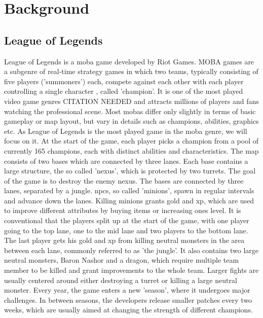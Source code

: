 \documentclass[12pt, a4paper, headinclude, twoside, plainheadsepline, open=right, numbers=noenddot, hidelinks, toc=listof, toc=bibliography]{scrreprt}
\begin{document}
\chapter{Background}
\label{chap:background}

\section{League of Legends}
\label{sec:LoL}

League of Legends is a \ac{moba} game developed by Riot Games.
MOBA games are a subgenre of real-time strategy games in which two teams, typically consisting of five players ('summoners') each, compete against each other with each player controlling a single character \cite{mora-cantallopsMOBAGamesLiterature2018a}, called 'champion'.
It is one of the most played video game genres CITATION NEEDED and attracts millions of players and fans watching the professional scene.
Most \acp{moba} differ only slightly in terms of basic gameplay or map layout, but vary in details such as champions, abilities, graphics etc.
As League of Legends is the most played game in the \ac{moba} genre, we will focus on it.
At the start of the game, each player picks a champion from a pool of currently 165 champions, each with distinct abilities and characteristics.
The map consists of two bases which are connected by three lanes.
Each base contains a large structure, the so called 'nexus', which is protected by two turrets. 
The goal of the game is to destroy the enemy nexus.
The bases are connected by three lanes, separated by a jungle.
\Acp{npc}, so called 'minions', spawn in regular intervals and advance down the lanes.
Killing minions grants gold and \ac{xp}, which are used to improve different attributes by buying items or increasing ones level.
It is conventional that the players split up at the start of the game, with one player going to the top lane, one to the mid lane and two players to the bottom lane.
The last player gets his gold and \ac{xp} from killing neutral monsters in the area between each lane, commonly referred to as 'the jungle'.
It also contains two large neutral monsters, Baron Nashor and a dragon, which require multiple team member to be killed and grant improvements to the whole team.
Larger fights are usually centered around either destroying a turret or killing a large neutral monster.
Every year, the game enters a new 'season', where it undergoes major challenges. 
In between seasons, the developers release smaller patches every two weeks, which are usually aimed at changing the strength of different champions.
\end{document}
